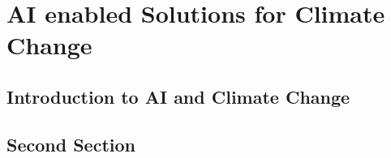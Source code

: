 \chapter{AI enabled Solutions for Climate Change} 
\label{chap:climate_change}

\lipsum[1-2]


\section{Introduction to AI and Climate Change}\label{sec:climate_change:intro}
    

\lipsum[1-2]
\section{Second Section}
\lipsum[1-2]
